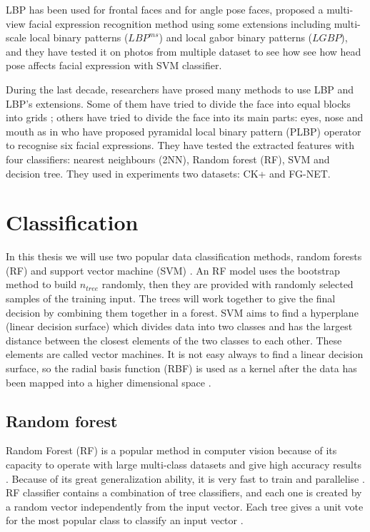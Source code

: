 LBP has been used for frontal faces and for angle pose faces, \citep{moore2011local} proposed a multi-view facial expression recognition method using  some extensions including multi-scale local binary patterns ($LBP^{ms}$) and local gabor binary patterns ($LGBP$), and they have tested it on photos from multiple dataset \citep{gross2010multi} to see how see how head pose affects facial expression with SVM classifier. 

During the last decade, researchers have prosed many methods to use LBP and LBP's extensions. Some of them have tried to divide the face into equal blocks into grids \citep{moore2011local}; others have tried to divide the face into its main parts: eyes, nose and mouth as in \citet{khan2013framework} who have proposed pyramidal local binary pattern (PLBP) operator to recognise six facial expressions. They have tested the extracted features with four classifiers: nearest neighbours (2NN), Random forest (RF), SVM and decision tree. They used in experiments two datasets: CK+ and FG-NET.  






\section{Classification}
\label{sec:ch1_Classification}
In this thesis we will use two popular data classification methods, random forests (RF) \citep{breiman2001random} and support vector machine (SVM) \citep{cortes1995support}. An RF model uses the bootstrap method to build $n_{tree}$ randomly, then they are provided with randomly selected
 samples of the training input. The trees will work together to give the final decision by combining them together in a forest. SVM aims to find a hyperplane (linear decision surface) which divides data into two classes and has the largest distance between the closest elements of the two classes to each other. These elements are called vector machines. It is not easy always to find a linear decision surface, so the radial basis function (RBF) is used 
as a kernel after the data has been mapped into a higher dimensional space \citep{davison2014micro}.

\subsection{Random forest}

Random Forest (RF) is a popular method in computer vision because of its capacity to operate with  large multi-class datasets and give high accuracy results \citep{fanelli2011real}. Because of its great generalization ability, it is very fast to train and parallelise \citep{breiman2001random,belle2008detection}. RF classifier contains a combination of tree classifiers, and each one is created by a random vector independently from the input vector. Each tree gives a unit vote for the most popular class to classify an input vector \citep{breiman1999}.

